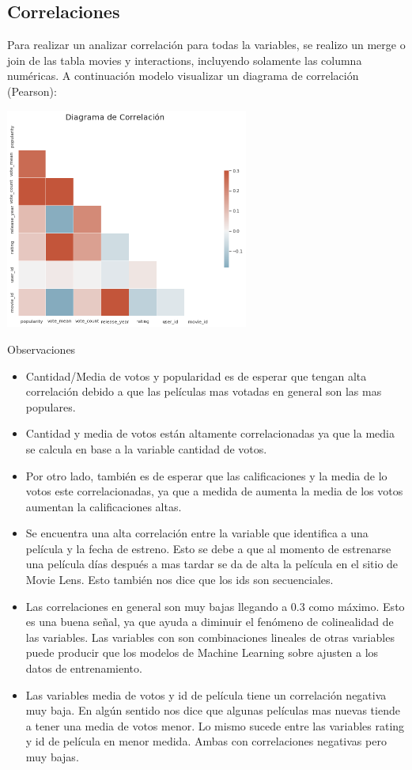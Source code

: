\documentclass[11pt,a4paper,twoside]{thesis}
\begin{document}
\subsection{Correlaciones}

Para realizar un analizar correlación para todas la variables, se realizo un merge o join de las tabla movies y interactions, incluyendo solamente las columna numéricas. A continuación modelo visualizar un diagrama de correlación (Pearson): 

\begin{center}
	\includegraphics[width=8cm]{./images/Correlations.png}
\end{center}
\begin{description}
	\item[Observaciones]
\end{description}
\begin{itemize}
	\item Cantidad/Media de votos y popularidad es de esperar que tengan alta correlación debido a que las películas mas votadas en general son las mas populares.
	\item Cantidad y media de votos están altamente correlacionadas ya que la media se calcula en base a la variable cantidad de votos.
	\item Por otro lado, también es de esperar que las calificaciones y la media de lo votos este correlacionadas, ya que a medida de aumenta la media de los votos aumentan la calificaciones altas.
	\item Se encuentra una alta correlación entre la variable que identifica a una película y la fecha de estreno. Esto se debe a que al momento de estrenarse una película días después a mas tardar se da de alta la película en el sitio de Movie Lens. Esto también nos dice que los ids son secuenciales.
	\item Las correlaciones en general son muy bajas llegando a 0.3 como máximo. Esto es una buena señal, ya que ayuda a diminuir el fenómeno de colinealidad de las variables. Las variables con son combinaciones lineales de otras variables puede producir que los modelos de Machine Learning sobre ajusten a los datos de entrenamiento.
	\item Las variables media de votos y id de película tiene un correlación negativa muy baja. En algún sentido nos dice que algunas películas mas nuevas tiende a tener una media de votos menor. Lo mismo sucede entre las variables rating y id de película en menor medida. Ambas con correlaciones negativas pero muy bajas.
\end{itemize}
\end{document}
